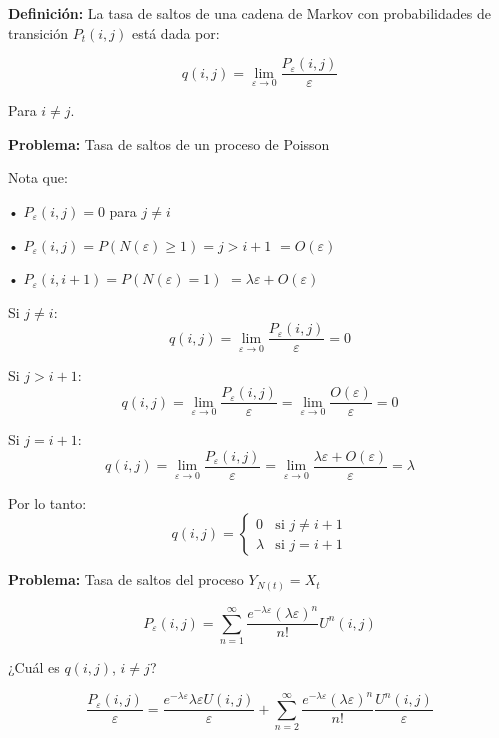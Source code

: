 \documentclass[12pt]{article}
\begin{document}
\textbf{Definición:} La tasa de saltos de una cadena de Markov con probabilidades de transición $P_t(i,j)$ está dada por:

\begin{equation*}
q(i,j) = \lim_{\varepsilon \to 0} \frac{P_\varepsilon(i,j)}{\varepsilon}
\end{equation*}

Para $i \neq j$.

\textbf{Problema:} Tasa de saltos de un proceso de Poisson

Nota que:

• $P_\varepsilon(i,j) = 0$ para $j \neq i$

• $P_\varepsilon(i,j) = P(N(\varepsilon) \geq 1) = j > i+1$
  $= O(\varepsilon)$

• $P_\varepsilon(i, i+1) = P(N(\varepsilon) = 1)$
  $= \lambda\varepsilon + O(\varepsilon)$

Si $j \neq i$:
\begin{equation*}
q(i,j) = \lim_{\varepsilon \to 0} \frac{P_\varepsilon(i,j)}{\varepsilon} = 0
\end{equation*}

Si $j > i+1$:
\begin{equation*}
q(i,j) = \lim_{\varepsilon \to 0} \frac{P_\varepsilon(i,j)}{\varepsilon} = \lim_{\varepsilon \to 0} \frac{O(\varepsilon)}{\varepsilon} = 0
\end{equation*}

Si $j = i+1$:
\begin{equation*}
q(i,j) = \lim_{\varepsilon \to 0} \frac{P_\varepsilon(i,j)}{\varepsilon} = \lim_{\varepsilon \to 0} \frac{\lambda\varepsilon + O(\varepsilon)}{\varepsilon} = \lambda
\end{equation*}

Por lo tanto:
\begin{equation*}
q(i,j) = \begin{cases}
0 & \text{si } j \neq i+1 \\
\lambda & \text{si } j = i+1
\end{cases}
\end{equation*}

\textbf{Problema:} Tasa de saltos del proceso $Y_{N(t)} = X_t$

\begin{equation*}
P_\varepsilon(i,j) = \sum_{n=1}^{\infty} \frac{e^{-\lambda\varepsilon}(\lambda\varepsilon)^n}{n!} U^n(i,j)
\end{equation*}

¿Cuál es $q(i,j)$, $i \neq j$?

\begin{equation*}
\frac{P_\varepsilon(i,j)}{\varepsilon} = \frac{e^{-\lambda\varepsilon} \lambda\varepsilon U(i,j)}{\varepsilon} + \sum_{n=2}^{\infty} \frac{e^{-\lambda\varepsilon}(\lambda\varepsilon)^n}{n!} \frac{U^n(i,j)}{\varepsilon}
\end{equation*}
\end{document}
